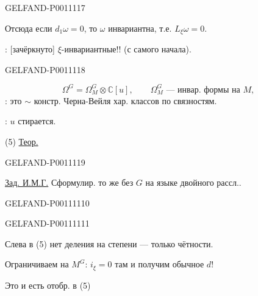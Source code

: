 \begin{GelfandAdjacentEvidence}{GELFAND-P001111}{7}


Отсюда если $d_1\omega=0$, то $\omega$ инвариантна, т.е. $L_\xi\omega=0$.

: [зачёркнуто] $\xi$-инвариантные!! (с самого начала).
\end{GelfandAdjacentEvidence}
\begin{GelfandAdjacentEvidence}{GELFAND-P001111}{8}

\[
\Omega^G=\Omega_M^G\otimes\mathbb C[u],\qquad
\Omega_M^G\text{ — инвар. формы на }M,
\]
: это $\sim$ констр. Черна-Вейля хар. классов по связностям.

: $u$ стирается.

(5) \underline{Теор.}
\end{GelfandAdjacentEvidence}
\begin{GelfandAdjacentEvidence}{GELFAND-P001111}{9}


\underline{Зад. И.М.Г.} Сформулир. то же без $G$ на языке двойного рассл..
\end{GelfandAdjacentEvidence}
\begin{GelfandAdjacentEvidence}{GELFAND-P001111}{10}


\end{GelfandAdjacentEvidence}
\begin{GelfandAdjacentEvidence}{GELFAND-P001111}{11}


Слева в (5) нет деления на степени — только чётности.

Ограничиваем на $M^G$: $i_\xi=0$ там и получим обычное $d$!

Это и есть отобр. в (5)

\end{GelfandAdjacentEvidence}



